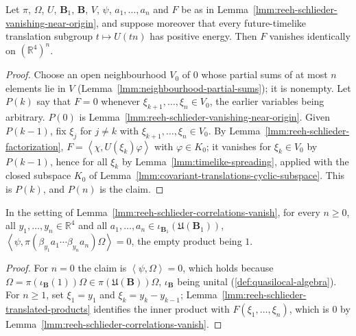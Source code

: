 \begin{lemma}
    \label{lmm:reeh-schlieder-correlations-vanish}
    \leanok
    Let $\pi$, $\Omega$, $U$, $\mathbf{B}_1$, $\mathbf{B}$, $V$, $\psi$, $a_1, \dots, a_n$ and $F$ be as in Lemma~\ref{lmm:reeh-schlieder-vanishing-near-origin}, and suppose moreover that every future-timelike translation subgroup $t \mapsto U(tn)$ has positive energy. Then $F$ vanishes identically on $(\mathbb{R}^4)^n$.
\end{lemma}
\begin{proof}
    \leanok
    Choose an open neighbourhood $V_0$ of $0$ whose partial sums of at most $n$ elements lie in $V$ (Lemma~\ref{lmm:neighbourhood-partial-sums}); it is nonempty. Let $P(k)$ say that $F = 0$ whenever $\xi_{k+1}, \dots, \xi_n \in V_0$, the earlier variables being arbitrary. $P(0)$ is Lemma~\ref{lmm:reeh-schlieder-vanishing-near-origin}. Given $P(k-1)$, fix $\xi_j$ for $j \ne k$ with $\xi_{k+1}, \dots, \xi_n \in V_0$. By Lemma~\ref{lmm:reeh-schlieder-factorization}, $F = \left< \chi, U(\xi_k)\varphi \right>$ with $\varphi \in K_0$; it vanishes for $\xi_k \in V_0$ by $P(k-1)$, hence for all $\xi_k$ by Lemma~\ref{lmm:timelike-spreading}, applied with the closed subspace $K_0$ of Lemma~\ref{lmm:covariant-translations-cyclic-subspace}. This is $P(k)$, and $P(n)$ is the claim.
\end{proof}

\begin{lemma}
    \label{lmm:reeh-schlieder-monomial-orthogonal}
    \leanok
    In the setting of Lemma~\ref{lmm:reeh-schlieder-correlations-vanish}, for every $n \ge 0$, all $y_1, \dots, y_n \in \mathbb{R}^4$ and all $a_1, \dots, a_n \in \iota_{\mathbf{B}_1}(\mathfrak{U}(\mathbf{B}_1))$, $\left< \psi, \pi(\beta_{y_1}a_1 \cdots \beta_{y_n}a_n)\Omega \right> = 0$, the empty product being $1$.
\end{lemma}
\begin{proof}
    \leanok
    For $n = 0$ the claim is $\left< \psi, \Omega \right> = 0$, which holds because $\Omega = \pi(\iota_{\mathbf{B}}(1))\Omega \in \pi(\mathfrak{U}(\mathbf{B}))\Omega$, $\iota_{\mathbf{B}}$ being unital (\ref{def:quasilocal-algebra}). For $n \ge 1$, set $\xi_1 = y_1$ and $\xi_k = y_k - y_{k-1}$; Lemma~\ref{lmm:reeh-schlieder-translated-products} identifies the inner product with $F(\xi_1, \dots, \xi_n)$, which is $0$ by Lemma~\ref{lmm:reeh-schlieder-correlations-vanish}.
\end{proof}

